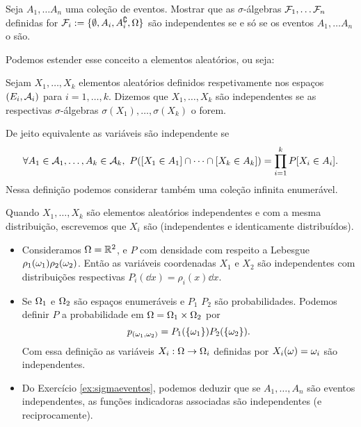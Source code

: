 \begin{exercise}\label{ex:sigmaeventos}
Seja $A_1,\dots A_n$ uma coleção de eventos.
Mostrar que as $\sigma$-álgebras ${\mathcal F}_1,\dots {\ensuremath{\mathcal F}}_n$ definidas for ${\mathcal F}_i:=\{\emptyset, A_i,A^{\complement}_i, \Omega\}$ são independentes se e só se
os eventos $A_1,\dots A_n$ o são.
\end{exercise}



Podemos estender esse conceito a elementos aleatórios, ou seja:
\begin{definition}
Sejam $X_1, \dots, X_k$ elementos aleatórios definidos respetivamente nos espaços $(E_i, {\mathcal A}_i)$ para $i=1,\dots,k$.
  Dizemos que  $X_1, \dots, X_k$ são  independentes  
 se as respectivas $\sigma$-álgebras $\sigma(X_1), \dots, \sigma(X_k)$ o forem.

 \medskip

 De jeito equivalente as variáveis são independente se
 \begin{equation}
 \forall A_1\in \cA_1,\dots ,A_k \in \cA_k, \ P([X_1\in A_1]\cap \dots \cap [X_k\in A_k])=\prod_{i=1}^k P[X_ i\in A_i].
\end{equation}
Nessa definição podemos considerar também uma coleção infinita enumerável.
\end{definition}

Quando $X_1, \dots, X_k$ são elementos aleatórios independentes e com a mesma distribuição, escrevemos que $X_i$
são \iid (independentes e identicamente distribuídos).

\begin{example}\label{exo:inde}
\begin{itemize}
 \item Consideramos $\Omega={\mathbb R}^2$, e $P$ com densidade com respeito a Lebesgue $\rho_1(\omega_1)\rho_2(\omega_2)$.
Então as variáveis coordenadas $X_1$ e $X_2$ são independentes com distribuições respectivas $P_i(\dd x)=\rho_i(x)\dd x$.
 \item Se $\Omega_1$ e $\Omega_2$ são espaços enumeráveis e $P_1$ $P_2$ são probabilidades.
 Podemos definir $P$ a probabilidade em $\Omega=\Omega_1\times \Omega_2$ por
 $$p_{(\omega_1,\omega_2)}=P_1(\{\omega_1\})P_2(\{\omega_2\}).$$
 Com essa definição as variáveis $X_i: \Omega\to \Omega_i$ definidas por $X_i(\omega)=\omega_i$ são independentes.
 \item Do Exercício \ref{ex:sigmaeventos}, podemos deduzir que se $A_1,\dots,A_n$ são eventos independentes,
 as funções indicadoras associadas são independentes (e reciprocamente).
\end{itemize}


\end{example}





